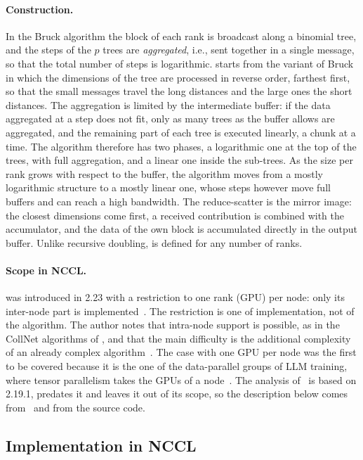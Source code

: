 \paragraph{Construction.}
In the Bruck algorithm the block of each rank is broadcast along a binomial tree, and the steps of the $p$ trees are \emph{aggregated}, i.e., sent together in a single message, so that the total number of steps is logarithmic.
\pat{} starts from the variant of Bruck in which the dimensions of the tree are processed in reverse order, farthest first, so that the small messages travel the long distances and the large ones the short distances.
The aggregation is limited by the intermediate buffer: if the data aggregated at a step does not fit, only as many trees as the buffer allows are aggregated, and the remaining part of each tree is executed linearly, a chunk at a time.
The algorithm therefore has two phases, a logarithmic one at the top of the trees, with full aggregation, and a linear one inside the sub-trees.
As the size per rank grows with respect to the buffer, the algorithm moves from a mostly logarithmic structure to a mostly linear one, whose steps however move full buffers and can reach a high bandwidth.
The reduce-scatter is the mirror image: the closest dimensions come first, a received contribution is combined with the accumulator, and the data of the own block is accumulated directly in the output buffer.
Unlike recursive doubling, \pat{} is defined for any number of ranks.

\paragraph{Scope in NCCL.}
\pat{} was introduced in \nccl{} 2.23 with a restriction to one rank (GPU) per node: only its inter-node part is implemented~\cite{jeaugey2025pat}.
The restriction is one of implementation, not of the algorithm.
The author notes that intra-node support is possible, as in the CollNet algorithms of \nccl{}, and that the main difficulty is the additional complexity of an already complex algorithm~\cite{jeaugey2025pat}. The case with one GPU per node was the first to be covered because it is the one of the data-parallel groups of LLM training, where tensor parallelism takes the GPUs of a node~\cite{jeaugey2025nccl223}.
The analysis of~\cite{hu2025demystifying} is based on \nccl{} 2.19.1, predates it and leaves it out of its scope, so the description below comes from~\cite{jeaugey2025pat} and from the source code.

\subsection{Implementation in NCCL}\label{sec:nccl-pat-impl}


